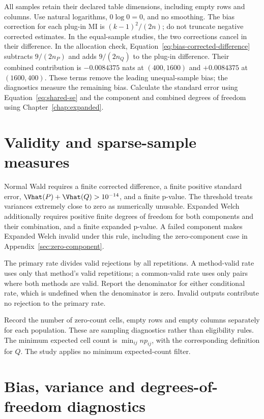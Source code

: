 All samples retain their declared table dimensions, including empty rows
and columns. Use natural logarithms, \(0\log0=0\), and no smoothing.
The bias correction for each plug-in MI is \((k-1)^2/(2n)\); do not truncate
negative corrected estimates. In the equal-sample studies, the two
corrections cancel in their difference. In the allocation check,
Equation~\eqref{eq:bias-corrected-difference} subtracts
\(9/(2n_P)\) and adds \(9/(2n_Q)\) to the plug-in difference.
Their combined contribution is \(-0.0084375\) nats at \((400,1600)\)
and \(+0.0084375\) at \((1600,400)\). These terms remove the leading
unequal-sample bias; the diagnostics measure the remaining bias.
Calculate the standard error using
Equation~\eqref{eq:shared-se} and the component and combined degrees of freedom
using Chapter~\ref{chap:expanded}.

\section{Validity and sparse-sample measures}
\label{sec:validity-rules}

Normal Wald requires a finite corrected difference, a finite positive
standard error, \(\Vhat(P)+\Vhat(Q)>10^{-14}\), and a finite p-value.
The threshold treats variances extremely close to zero as numerically
unusable. Expanded Welch additionally requires positive finite degrees
of freedom for both components and their combination, and a finite
expanded p-value. A failed component makes Expanded Welch invalid under
this rule, including the zero-component case in
Appendix~\ref{sec:zero-component}.

The primary rate divides valid rejections by all repetitions. A
method-valid rate uses only that method's valid repetitions; a
common-valid rate uses only pairs where both methods are valid. Report
the denominator for either conditional rate, which is undefined when
the denominator is zero. Invalid outputs contribute no rejection to
the primary rate.

Record the number of zero-count cells, empty rows and empty columns
separately for each population. These are sampling diagnostics rather
than eligibility rules. The minimum expected cell count is
\(\min_{ij}np_{ij}\), with the corresponding definition for \(Q\).
The study applies no minimum expected-count filter.

\section{Bias, variance and degrees-of-freedom diagnostics}
\label{sec:estimation-diagnostics}

